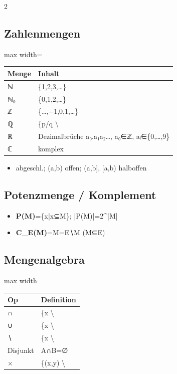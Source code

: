 \documentclass[10pt, a4paper]{article}
\begin{document}
\begin{multicols}{2}
\subsection{Zahlenmengen}

{\small
\begin{adjustbox}{max width=\linewidth}
{\scriptsize
\begin{tabular}{ll}
\toprule
\textbf{Menge} & \textbf{Inhalt} \\
\midrule
ℕ & \{1,2,3,…\} \\
ℕ₀ & \{0,1,2,…\} \\
ℤ & \{…,−1,0,1,…\} \\
ℚ & \{p/q \textbackslash{} \\
ℝ & Dezimalbrüche a₀.a₁a₂…, a₀∈ℤ, aᵢ∈\{0,…,9\} \\
ℂ & komplex \\
\bottomrule
\end{tabular}
}
\end{adjustbox}
}


\begin{itemize}
  \item [a,b] abgeschl.; (a,b) offen; (a,b], [a,b) halboffen
\end{itemize}


\subsection{Potenzmenge / Komplement}
\begin{itemize}
  \item \textbf{P(M)}=\{x|x⊆M\}; |P(M)|=2\textasciicircum{}|M|
  \item \textbf{C\_E(M)}=M̄=E∖M (M⊆E)
\end{itemize}


\subsection{Mengenalgebra}

{\small
\begin{adjustbox}{max width=\linewidth}
{\scriptsize
\begin{tabular}{ll}
\toprule
\textbf{Op} & \textbf{Definition} \\
\midrule
∩ & \{x \textbackslash{} \\
∪ & \{x \textbackslash{} \\
∖ & \{x \textbackslash{} \\
Disjunkt & A∩B=∅ \\
× & \{(x,y) \textbackslash{} \\
\bottomrule
\end{tabular}
}
\end{adjustbox}
}



\end{multicols}
\end{document}
